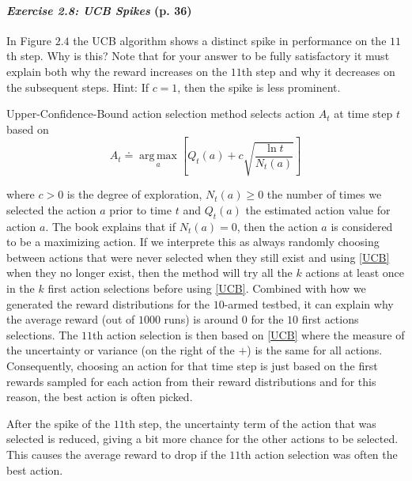 \documentclass[10pt,a4paper]{article}
\DeclareMathOperator*{\argmax}{arg\,max}
\begin{document}


\paragraph{\textit{Exercise 2.8: UCB Spikes} (p. 36)} In Figure $2.4$ the UCB algorithm shows a distinct spike
in performance on the $11$th step. Why is this? Note that for your answer to be fully satisfactory it must explain both why the reward increases on the $11$th step and why it decreases on the subsequent steps. Hint: If $c = 1$, then the spike is less prominent.

\bigskip
Upper-Confidence-Bound action selection method selects action $A_t$ at time step $t$ based on 
\begin{equation}\label{UCB}
A_t \doteq \argmax\limits_{a}\left[Q_t(a) + c \sqrt{\frac{\ln t}{N_t(a)}}\right]
\end{equation}

where $c > 0$ is the degree of exploration, $N_t(a) \geq 0$ the number of times we selected the action $a$ prior to time $t$ and $Q_t(a)$ the estimated action value for action $a$.
The book explains that if $N_t(a) = 0$, then the action $a$ is considered to be a maximizing action. If we interprete this as always randomly choosing between actions that were never selected when they still exist and using \ref{UCB} when they no longer exist, then the method will try all the $k$ actions at least once in the $k$ first action selections before using \ref{UCB}. Combined with how we generated the reward distributions for the $10$-armed testbed, it can explain why the average reward (out of $1000$ runs) is around $0$ for the $10$ first actions selections. The $11$th action selection is then based on \ref{UCB} where the measure of the uncertainty or variance (on the right of the $+$) is the same for all actions. Consequently, choosing an action for that time step is just based on the first rewards sampled for each action from their reward distributions and for this reason, the best action is often picked.

After the spike of the $11$th step, the uncertainty term of the action that was selected is reduced, giving a bit more chance for the other actions to be selected.
This causes the average reward to drop if the $11$th action selection was often the best action.
\end{document}
